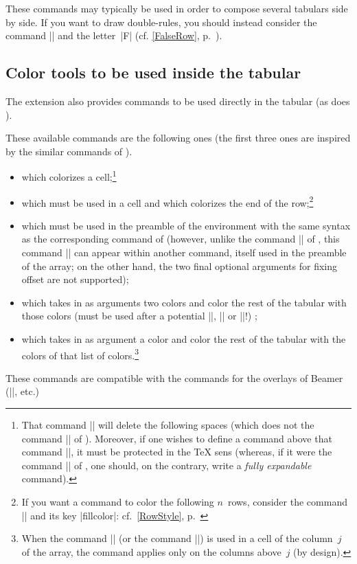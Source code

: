\documentclass[dvipsnames]{article}
\begin{document}
\medskip
These commands may typically be used in order to compose several tabulars side
by side. If you want to draw double-rules, you should instead consider the
command |\FalseRow| and the letter~|F| (cf. \ref{FalseRow}, p.~\pageref{FalseRow}).


\subsection{Color tools to be used inside the tabular}


The extension  also provides commands to be used directly in the
tabular (as does ).

These available commands are the following ones (the first three ones are
inspired by the similar commands of ).
\begin{itemize}
\item {} which colorizes a cell;\footnote{That
  command |\cellcolor| will delete the following spaces (which does not the
  command |\cellcolor| of ). Moreover, if one wishes to define a
  command above that command |\cellcolor|, it must be protected in the TeX sens
  (whereas, if it were the command |\cellcolor| of , one should,
  on the contrary, write a \emph{fully expandable} command).}
\item {} which must be used in a cell and which
colorizes the end of the row;\footnote{If you want a command to color the
  following $n$~rows, consider the command |\RowStyle| and its key |fillcolor|:
  cf.~\ref{RowStyle}, p.~\pageref{RowStyle}} 
\item {} which must be used in the preamble of the
environment with the same syntax as the corresponding command of 
(however, unlike the command |\columncolor| of , this command
|\columncolor| can appear within another command, itself used in the preamble of
the array; on the other hand, the two final optional arguments for fixing offset
are not supported);
\item {} which takes in as arguments two colors and
color the rest of the tabular with those colors (must be used after a potential
|\hline|, |\Hline| or |\toprule|!) ;
\item {} which takes in as argument a color and
color the rest of the tabular with the colors of that list of
colors.\footnote{When the command |\rowlistcolors| (or the command |\rowcolors|)
  is used in a cell of the column~$j$ of the array, the command applies only on
  the columns above~$j$ (by design).}
\end{itemize}
These commands are compatible with the commands for the overlays of Beamer
(|\only|, etc.) 
\end{document}
